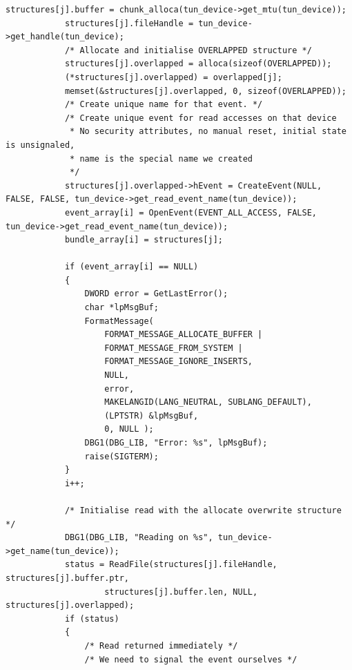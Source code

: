 \begin{lstlisting}[caption=Code für handle\_plain auf Windows]
            structures[j].buffer = chunk_alloca(tun_device->get_mtu(tun_device));
            structures[j].fileHandle = tun_device->get_handle(tun_device);
            /* Allocate and initialise OVERLAPPED structure */
            structures[j].overlapped = alloca(sizeof(OVERLAPPED));
            (*structures[j].overlapped) = overlapped[j];
            memset(&structures[j].overlapped, 0, sizeof(OVERLAPPED));
            /* Create unique name for that event. */
            /* Create unique event for read accesses on that device
             * No security attributes, no manual reset, initial state is unsignaled,
             * name is the special name we created
             */
            structures[j].overlapped->hEvent = CreateEvent(NULL, FALSE, FALSE, tun_device->get_read_event_name(tun_device));
            event_array[i] = OpenEvent(EVENT_ALL_ACCESS, FALSE, tun_device->get_read_event_name(tun_device));
            bundle_array[i] = structures[j];

            if (event_array[i] == NULL)
            {
                DWORD error = GetLastError();
                char *lpMsgBuf;
                FormatMessage(
                    FORMAT_MESSAGE_ALLOCATE_BUFFER |
                    FORMAT_MESSAGE_FROM_SYSTEM |
                    FORMAT_MESSAGE_IGNORE_INSERTS,
                    NULL,
                    error,
                    MAKELANGID(LANG_NEUTRAL, SUBLANG_DEFAULT),
                    (LPTSTR) &lpMsgBuf,
                    0, NULL );
                DBG1(DBG_LIB, "Error: %s", lpMsgBuf);
                raise(SIGTERM);
            }
            i++;

            /* Initialise read with the allocate overwrite structure */
            DBG1(DBG_LIB, "Reading on %s", tun_device->get_name(tun_device));
            status = ReadFile(structures[j].fileHandle, structures[j].buffer.ptr,
                    structures[j].buffer.len, NULL, structures[j].overlapped);
            if (status)
            {
                /* Read returned immediately */
                /* We need to signal the event ourselves */


\end{lstlisting}
